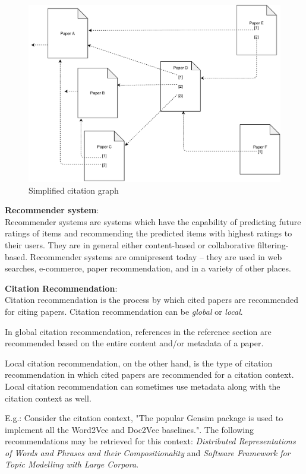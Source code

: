 \begin{figure}
 \includegraphics[keepaspectratio, width=13cm]{figures/Background/citationgraph.pdf}
  \caption{Simplified citation graph}
  \label{fig:citationgraph}
\end{figure}
\textbf{Recommender system}: \\
Recommender systems are systems which have the capability of predicting future ratings of items and recommending the predicted items with highest ratings to their users. They are in general either content-based or collaborative filtering-based.
Recommender systems are omnipresent today -- they are used in web searches, e-commerce, paper recommendation, and in a variety of other places. 

\textbf{Citation Recommendation}:\\
Citation recommendation is the process by which cited papers are recommended for citing papers. Citation recommendation can be \textit{global} or \textit{local}. 

In global citation recommendation, references in the reference section are recommended based on the entire content and/or metadata of a paper. 

Local citation recommendation, on the other hand, is the type of citation recommendation in which cited papers are recommended for a citation context. Local citation recommendation can sometimes use metadata along with the citation context as well.

E.g.: Consider the citation context, "The popular Gensim package is used to implement all the Word2Vec and Doc2Vec baselines.". The following recommendations may be retrieved for this context: \textit{Distributed Representations of Words and Phrases
and their Compositionality}\cite{MikolovSCCD13} and \textit{Software Framework for Topic Modelling with Large Corpora}\cite{rehureklrec}.

